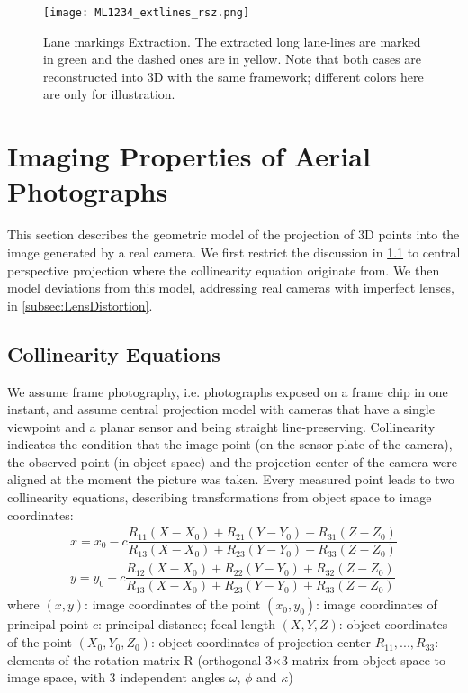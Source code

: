\begin{figure}
  \centering
  \texttt{[image: ML1234\_extlines\_rsz.png]}
  \caption{\small Lane markings Extraction. The extracted long lane-lines are marked in green and the dashed ones are in yellow.  Note that both cases are reconstructed into 3D with the same framework; different colors here are only for illustration.}
  \label{fig:LineExtraction}
\end{figure}



\section{Imaging Properties of Aerial Photographs}
\label{sec:Geometry}

This section describes the geometric model of the projection of 3D points into the image generated by a real camera. We first restrict the discussion in \cref{subsec:Collinearity} to central perspective projection where the collinearity equation originate from. We then model deviations from this model, addressing real cameras with imperfect lenses, in \cref{subsec:LensDistortion}.

\subsection{Collinearity Equations}
\label{subsec:Collinearity}
We assume frame photography, i.e. photographs exposed on a frame chip in one instant, and assume central projection model with cameras that have a single viewpoint and a planar sensor and being straight line-preserving. Collinearity indicates the condition that the image point (on the sensor plate of the camera), the observed point (in object space) and the projection center of the camera were aligned at the moment the picture was taken. Every measured point leads to two collinearity equations, describing transformations from object space to image coordinates:
\begin{equation} \label{eq:collinearity}
\begin{split}
x = x_0 -c \dfrac {R_{11}(X-X_0) + R_{21}(Y-Y_0) + R_{31}(Z-Z_0)} {R_{13}(X-X_0) + R_{23}(Y-Y_0) + R_{33}(Z-Z_0)} \\
y = y_0 -c \dfrac {R_{12}(X-X_0) + R_{22}(Y-Y_0) + R_{32}(Z-Z_0)} {R_{13}(X-X_0) + R_{23}(Y-Y_0) + R_{33}(Z-Z_0)}
\end{split}
\end{equation}
where\newline
$(x, y)$: image coordinates of the point \newline
$(x_0, y_0)$: image coordinates of principal point \newline
$c$: principal distance; focal length \newline
$(X, Y, Z)$: object coordinates of the point \newline
$(X_0, Y_0, Z_0)$: object coordinates of projection center \newline
$R_{11},...,R_{33}$: elements of the rotation matrix R (orthogonal 3$\times$3-matrix from object space to image space, with 3 independent angles $\omega$, $\phi$ and $\kappa$)

